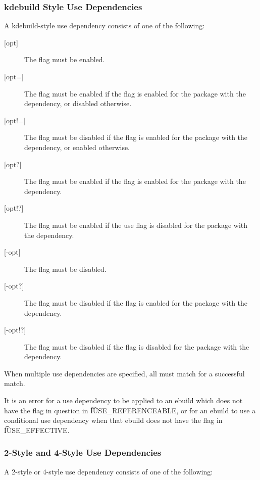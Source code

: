 \IFKDEBUILDELSE
{
    \subsubsection{kdebuild Style Use Dependencies}
    \label{sec:kdebuild-use-dep}

    A kdebuild-style use dependency consists of one of the following:

    \begin{description}
    \item[{[opt]}] The flag must be enabled.
    \item[{[opt=]}] The flag must be enabled if the flag is enabled for the package with the
        dependency, or disabled otherwise.
    \item[{[opt!=]}] The flag must be disabled if the flag is enabled for the package with the
        dependency, or enabled otherwise.
    \item[{[opt?]}] The flag must be enabled if the flag is enabled for the package with the
        dependency.
    \item[{[opt!?]}] The flag must be enabled if the use flag is disabled for the package with the
        dependency.
    \item[{[-opt]}] The flag must be disabled.
    \item[{[-opt?]}] The flag must be disabled if the flag is enabled for the package with the
        dependency.
    \item[{[-opt!?]}] The flag must be disabled if the flag is disabled for the package with the
        dependency.
    \end{description}

    When multiple use dependencies are specified, all must match for a successful match.

    It is an error for a use dependency to be applied to an ebuild which does not have the flag in
    question in \t{IUSE\_REFERENCEABLE}, or for an ebuild to use a conditional use dependency when
    that ebuild does not have the flag in \t{IUSE\_EFFECTIVE}.
}{
}

\subsubsection{2-Style and 4-Style Use Dependencies}
\label{sec:use-dep}

A 2-style or 4-style use dependency consists of one of the following:

